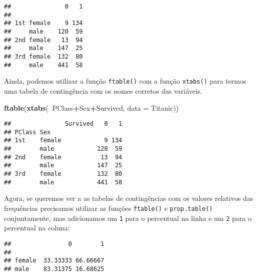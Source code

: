 \documentclass[]{book}
\newenvironment{Shaded}{\begin{snugshade}}{\end{snugshade}}
\newcommand{\DataTypeTok}[1]{\textcolor[rgb]{0.13,0.29,0.53}{#1}}
\newcommand{\DecValTok}[1]{\textcolor[rgb]{0.00,0.00,0.81}{#1}}
\newcommand{\KeywordTok}[1]{\textcolor[rgb]{0.13,0.29,0.53}{\textbf{#1}}}
\newcommand{\NormalTok}[1]{#1}
\newcommand{\OperatorTok}[1]{\textcolor[rgb]{0.81,0.36,0.00}{\textbf{#1}}}
\theoremstyle{definition}
\theoremstyle{definition}
\theoremstyle{definition}
\theoremstyle{remark}
\begin{document}
\begin{verbatim}
##               0   1
##                    
## 1st female    9 134
##     male    120  59
## 2nd female   13  94
##     male    147  25
## 3rd female  132  80
##     male    441  58
\end{verbatim}

Ainda, podemos utilizar a função \texttt{ftable()} com a função \texttt{xtabs()} para termos uma tabela de contingência com os nomes corretos das variáveis.

\begin{Shaded}
\begin{Highlighting}[]
\KeywordTok{ftable}\NormalTok{(}\KeywordTok{xtabs}\NormalTok{(}\OperatorTok{~}\NormalTok{PClass}\OperatorTok{+}\NormalTok{Sex}\OperatorTok{+}\NormalTok{Survived, }\DataTypeTok{data =}\NormalTok{ Titanic))}
\end{Highlighting}
\end{Shaded}

\begin{verbatim}
##               Survived   0   1
## PClass Sex                    
## 1st    female            9 134
##        male            120  59
## 2nd    female           13  94
##        male            147  25
## 3rd    female          132  80
##        male            441  58
\end{verbatim}

Agora, se queremos ver a as tabelas de contingências com os valores relativos das frequências precisamos utilizar as funções \texttt{ftable()} e \texttt{prop.table()} conjuntamente, mas adicionamos um \texttt{1} para o percentual na linha e um \texttt{2} para o percentual na coluna:

\begin{Shaded}
\end{Shaded}

\begin{verbatim}
##                0        1
##                          
## female  33.33333 66.66667
## male    83.31375 16.68625
\end{verbatim}

\begin{Shaded}
\end{Shaded}
\end{document}

